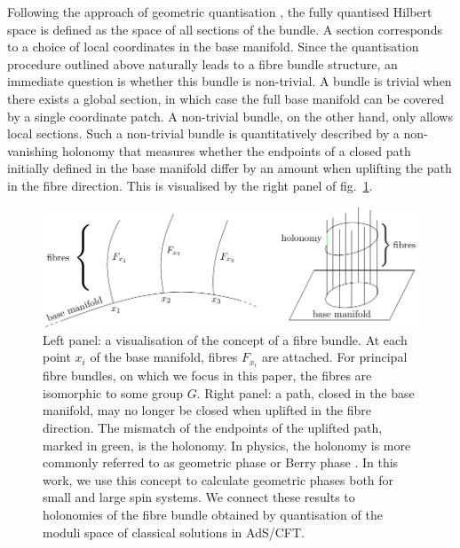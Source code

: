 \documentclass[a4paper,11pt]{article}
\newcommand{\1}{\mathds{1}}
\begin{document}
Following the approach of geometric quantisation \cite{Souriau1966geometric,Kostant1970quantization}, the fully quantised Hilbert space is defined as the space of all sections of the bundle. A section corresponds to a choice of local coordinates in the base manifold. Since the quantisation procedure outlined above naturally leads to a fibre bundle structure, an immediate question is whether this bundle is non-trivial. A bundle is trivial when there exists a global section, in which case the full base manifold can be covered by a single coordinate patch. A non-trivial bundle, on the other hand, only allows local sections. Such a non-trivial bundle is quantitatively described by a non-vanishing holonomy that measures whether the endpoints of a closed path initially defined in the base manifold differ by an amount when uplifting the path in the fibre direction. This is visualised by the right panel of fig.~\ref{fig:BaseManifoldFibreAndHolonomy}.
\begin{figure}[b]
    \centering
    \includegraphics{BaseManifoldFibreAndHolonomy.pdf}
    \caption{Left panel: a visualisation of the concept of a fibre bundle. At each point $x_i$ of the base manifold, fibres $F_{x_i}$ are attached. For principal fibre bundles, on which we focus in this paper, the fibres are isomorphic to some group $G$. Right panel: a path, closed in the base manifold, may no longer be closed when uplifted in the fibre direction. The mismatch of the endpoints of the uplifted path, marked in green, is the holonomy. In physics, the holonomy is more commonly referred to as geometric phase or Berry phase \cite{Berry:1984jv,Simon:1983mh}. In this work, we use this concept to calculate geometric phases both for small and large spin systems. We connect these results to holonomies of the fibre bundle obtained by quantisation of the moduli space of classical solutions in AdS/CFT.}
    \label{fig:BaseManifoldFibreAndHolonomy}
\end{figure}
\end{document}
